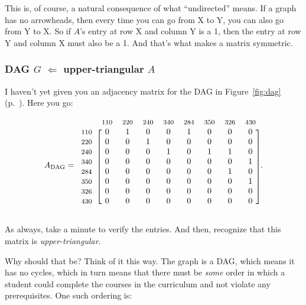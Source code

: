 This is, of course, a natural consequence of what ``undirected'' means. If a
graph has no arrowheads, then every time you can go from X to Y, you can also
go from Y to X. So if $A$'s entry at row X and column Y is a 1, then the entry
at row Y and column X must also be a 1. And that's what makes a matrix
symmetric.


\subsubsection{DAG $G$ $\Leftarrow$ upper-triangular $A$}

I haven't yet given you an adjacency matrix for the DAG in Figure~\ref{fig:dag}
(p.~\pageref{fig:dag}). Here you go:

\[
A_{\textrm{DAG}} = 
\begin{blockarray}{ccccccccc}
& {\footnotesize\textrm{110}}
& {\footnotesize\textrm{220}}
& {\footnotesize\textrm{240}}
& {\footnotesize\textrm{340}}
& {\footnotesize\textrm{284}}
& {\footnotesize\textrm{350}}
& {\footnotesize\textrm{326}}
& {\footnotesize\textrm{430}} \\
\begin{block}{c[cccccccc]}
{\footnotesize\textrm{110}} & 0 & 1 & 0 & 0 & 1 & 0 & 0 & 0 \\
{\footnotesize\textrm{220}} & 0 & 0 & 1 & 0 & 0 & 0 & 0 & 0 \\
{\footnotesize\textrm{240}} & 0 & 0 & 0 & 1 & 0 & 1 & 1 & 0 \\
{\footnotesize\textrm{340}} & 0 & 0 & 0 & 0 & 0 & 0 & 0 & 1 \\
{\footnotesize\textrm{284}} & 0 & 0 & 0 & 0 & 0 & 0 & 1 & 0 \\
{\footnotesize\textrm{350}} & 0 & 0 & 0 & 0 & 0 & 0 & 0 & 1 \\
{\footnotesize\textrm{326}} & 0 & 0 & 0 & 0 & 0 & 0 & 0 & 0 \\
{\footnotesize\textrm{430}} & 0 & 0 & 0 & 0 & 0 & 0 & 0 & 0 \\
\end{block}
\end{blockarray}.
\]


As always, take a minute to verify the entries. And then, recognize that this
matrix is \textit{upper-triangular}.

Why should that be? Think of it this way. The graph is a DAG, which means it
has no cycles, which in turn means that there must be \textit{some} order in
which a student could complete the courses in the curriculum and not violate
any prerequisites. One such ordering is:

